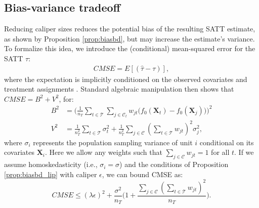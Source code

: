 \documentclass{article}
\newcommand{\bX}{\mathbf{X}}
\newcommand{\Xt}{\mathbf{X}_t}
\newcommand{\Xj}{\mathbf{X}_j}
\newcommand{\Ct}{\mathcal{C}_{t}}
\begin{document}
\subsection{Bias-variance tradeoff}

Reducing caliper sizes reduces the potential bias of the resulting SATT estimate, as shown by Proposition \ref{prop:biasbd}, but may increase the estimate's variance.
To formalize this idea, we introduce the (conditional) mean-squared error for the SATT $\tau$:
\begin{align*}
    CMSE = E[(\hat{\tau} - \tau)],
\end{align*}
where the expectation is implicitly conditioned on the observed covariates and treatment assignments \citep{kallus2020generalized}.
Standard algebraic manipulation then shows that $CMSE = B^2 + V^2$, for:
\begin{align*}
    B^2 &= 
        \Big(\frac{1}{n_T} \sum_{t \in \mathcal{T}} \sum_{j \in \Ct} 
            w_{jt} \big( f_0(\Xt) - f_0(\Xj) \big) \Big)^2 \\
    V^2 &=
        \frac{1}{n_T^2} \sum_{t \in \mathcal{T}} \sigma_t^2 +
        \frac{1}{n_T^2} \sum_{j \in \mathcal{C}} (\sum_{t \in \mathcal{T}} w_{jt})^2 \sigma_j^2,
\end{align*}
where $\sigma_i$ represents the population sampling variance of unit $i$ conditional on its covariates $\bX_i$.
Here we allow any weights such that $\sum_{j \in \mathcal{C}} w_{jt} = 1$ for all $t$.
If we assume homoskedasticity (i.e., $\sigma_i = \sigma$) and the conditions of Proposition \ref{prop:biasbd_lip} with caliper $\epsilon$, we can bound CMSE as:
\begin{equation}
\label{eq:cmsebd}
    CMSE \leq 
        (\lambda \epsilon)^2 +
        \frac{\sigma^2}{n_T} \Big(1 + \frac{\sum_{j \in \mathcal{C}} (\sum_{t \in \mathcal{T}} w_{jt})^2}{n_T} \Big).
\end{equation}
\end{document}
